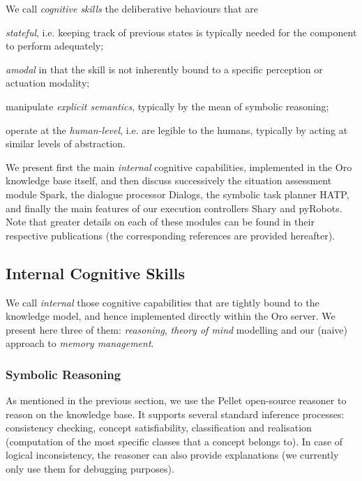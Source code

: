 \documentclass[preprint,3p,times]{elsarticle}
\newcommand{\ie}{i.e.\xspace}
\begin{document}
\begin{inparaenum} We call \emph{cognitive skills} the
deliberative behaviours that are \item \emph{stateful}, \ie keeping track of
previous states is typically needed for the component to perform adequately;
\item \emph{amodal} in that the skill is not inherently bound to a specific
perception or actuation modality; \item manipulate \emph{explicit semantics},
typically by the mean of symbolic reasoning; \item operate at the
    \emph{human-level}, \ie are legible to the humans, typically by acting at
similar levels of abstraction.\end{inparaenum}

We present first the main \emph{internal} cognitive capabilities, implemented in
the {\sc Oro} knowledge base itself, and then discuss successively the situation
assessment module {\sc Spark}, the dialogue processor {\sc Dialogs}, the
symbolic task planner HATP, and finally the main features of our execution
controllers {\sc Shary} and {\sc pyRobots}. Note that greater details on each of
these modules can be found in their respective publications (the corresponding
references are provided hereafter).

\subsection{Internal Cognitive Skills}
\label{sect|intern}

We call \emph{internal} those cognitive capabilities that are tightly bound to
the knowledge model, and hence implemented directly within the {\sc Oro} server.
We present here three of them: \emph{reasoning}, \emph{theory of mind} modelling
and our (naive) approach to \emph{memory management}.

\subsubsection{Symbolic Reasoning}
\label{reasoning}

As mentioned in the previous section, we use the Pellet open-source reasoner to
reason on the knowledge base. It supports several standard inference processes:
consistency checking, concept satisfiability, classification and realisation
(computation of the most specific classes that a concept belongs to). In
case of logical inconsistency, the reasoner can also provide explanations (we
currently only use them for debugging purposes).
\end{document}
